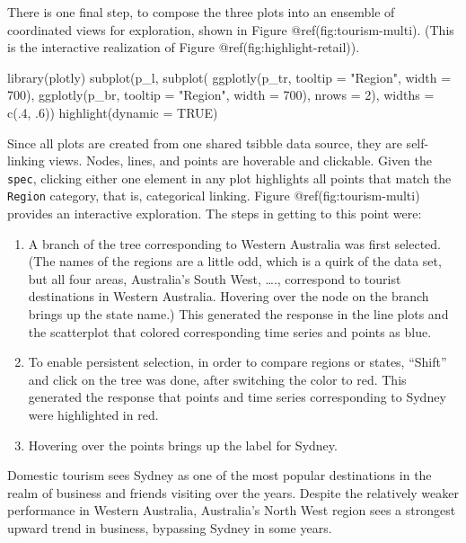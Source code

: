 There is one final step, to compose the three plots into an ensemble of
coordinated views for exploration, shown in Figure
@ref(fig:tourism-multi). (This is the interactive realization of Figure
@ref(fig:highlight-retail)).

\begin{Schunk}
\begin{Sinput}
library(plotly)
subplot(p_l,
  subplot(
    ggplotly(p_tr, tooltip = "Region", width = 700),
    ggplotly(p_br, tooltip = "Region", width = 700),
    nrows = 2),
  widths = c(.4, .6)) %
  highlight(dynamic = TRUE)
\end{Sinput}
\end{Schunk}

Since all plots are created from one shared tsibble data source, they
are self-linking views. Nodes, lines, and points are hoverable and
clickable. Given the \texttt{spec}, clicking either one element in any
plot highlights all points that match the \texttt{Region} category, that
is, categorical linking. Figure @ref(fig:tourism-multi) provides an
interactive exploration. The steps in getting to this point were:

\begin{enumerate}
\def\labelenumi{\arabic{enumi}.}
\tightlist
\item
  A branch of the tree corresponding to Western Australia was first
  selected. (The names of the regions are a little odd, which is a quirk
  of the data set, but all four areas, Australia's South West, \ldots.,
  correspond to tourist destinations in Western Australia. Hovering over
  the node on the branch brings up the state name.) This generated the
  response in the line plots and the scatterplot that colored
  corresponding time series and points as blue.
\item
  To enable persistent selection, in order to compare regions or states,
  ``Shift'' and click on the tree was done, after switching the color to
  red. This generated the response that points and time series
  corresponding to Sydney were highlighted in red.
\item
  Hovering over the points brings up the label for Sydney.
\end{enumerate}

Domestic tourism sees Sydney as one of the most popular destinations in
the realm of business and friends visiting over the years. Despite the
relatively weaker performance in Western Australia, Australia's North
West region sees a strongest upward trend in business, bypassing Sydney
in some years.

